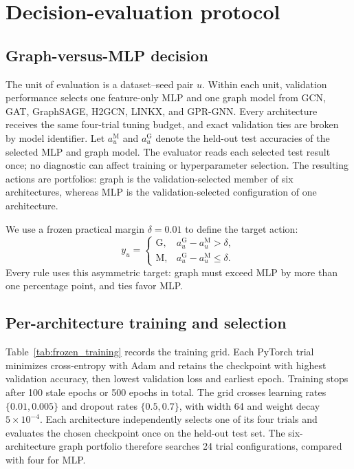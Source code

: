 \section{Decision-evaluation protocol}
\label{sec:protocol}

\subsection{Graph-versus-MLP decision}

The unit of evaluation is a dataset--seed pair $u$. Within each unit, validation performance selects one feature-only MLP and one graph model from GCN, GAT, GraphSAGE, H2GCN, LINKX, and GPR-GNN. Every architecture receives the same four-trial tuning budget, and exact validation ties are broken by model identifier. Let $a_u^{\mathrm{M}}$ and $a_u^{\mathrm{G}}$ denote the held-out test accuracies of the selected MLP and graph model. The evaluator reads each selected test result once; no diagnostic can affect training or hyperparameter selection. The resulting actions are portfolios: graph is the validation-selected member of six architectures, whereas MLP is the validation-selected configuration of one architecture.

We use a frozen practical margin $\delta=0.01$ to define the target action:
\begin{equation}
y_u =
\begin{cases}
\mathrm{G}, & a_u^{\mathrm{G}}-a_u^{\mathrm{M}}>\delta,\\
\mathrm{M}, & a_u^{\mathrm{G}}-a_u^{\mathrm{M}}\leq\delta.
\end{cases}
\label{eq:decision_target}
\end{equation}
Every rule uses this asymmetric target: graph must exceed MLP by more than one percentage point, and ties favor MLP.

\subsection{Per-architecture training and selection}

Table~\ref{tab:frozen_training} records the training grid. Each PyTorch trial~\citep{paszke2019pytorch} minimizes cross-entropy with Adam and retains the checkpoint with highest validation accuracy, then lowest validation loss and earliest epoch. Training stops after 100 stale epochs or 500 epochs in total. The grid crosses learning rates $\{0.01,0.005\}$ and dropout rates $\{0.5,0.7\}$, with width 64 and weight decay $5\times10^{-4}$. Each architecture independently selects one of its four trials and evaluates the chosen checkpoint once on the held-out test set. The six-architecture graph portfolio therefore searches 24 trial configurations, compared with four for MLP.



